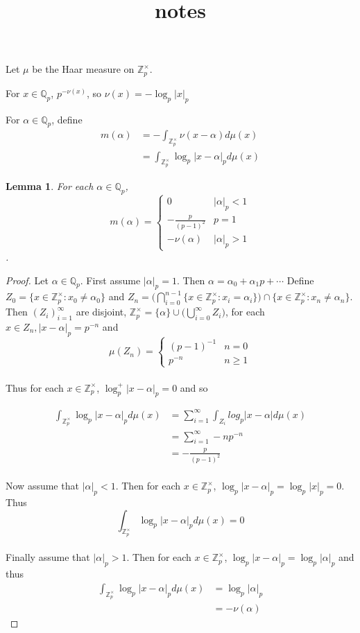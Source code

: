 \documentclass[12pt]{amsart}
\newtheorem{lem}[thm]{Lemma}
\newcommand{\al}{\alpha}
\newcommand{\Z}{\mathbb{Z}}
\newcommand{\Q}{\mathbb{Q}}
\begin{document}
\title{notes}
\maketitle

Let $\mu$ be the Haar measure on $\Z_p^{\times}$.

For $x \in \Q_p$, $p^{-\nu(x)}$, so $\nu(x) = -\log_p|x|_p$

For $\al \in \Q_p$, define 
\begin{align*}
m(\al)
& = -\int_{\Z_p^{\times}}\nu(x-\al)d\mu(x)\\
& = \int_{\Z_p^{\times}}\log_p|x-\al|_pd\mu(x)
\end{align*}

\begin{lem}
For each $\al \in \Q_p$, 
$$m(\al) = 
\begin{cases} 
      0 & |\al|_p <1 \\
      -\frac{p}{(p-1)^2} & p = 1\\
      -\nu(\al) & |\al|_p >1
   \end{cases}$$. 
\end{lem}

\begin{proof}
Let $\al \in \Q_p$. First assume $|\al|_p=1$. Then $\al = \al_0 + \al_1p + \cdots$ Define $Z_0 = \{x \in \Z_p^{\times} : x_0 \neq \al_0\}$ and $Z_n = \bigg(\bigcap_{i=0}^{n-1}\{x \in \Z_p^{\times}: x_i = \al_i\}\bigg) \cap \{x \in \Z_p^{\times}: x_n \neq \al_n\}$. \\Then $(Z_i)_{i=1}^{\infty}$ are disjoint, $\Z_p^{\times} = \{\al\} \cup \bigg(\bigcup_{i=0}^{\infty} Z_i\bigg)$, for each $x \in Z_n, |x-\al|_p = p^{-n}$ and $$ \mu(Z_n) =  \begin{cases} 
      (p-1)^{-1} & n=0 \\
      p^{-n} & n \geq 1
   \end{cases} $$ \\ Thus for each $x \in \Z_p^{\times}$, $\log^+_p|x-\al|_p = 0$ and so 

\begin{align*}
\int_{\Z_p^{\times} }\log_p|x-\al|_pd\mu(x)
&= \sum_{i=1}^{\infty} \int_{Z_i}log_p|x-\al|d\mu(x)\\
&= \sum_{i=1}^\infty -np^{-n}\\
&= -\frac{p}{(p-1)^2}
\end{align*} \\ Now assume that $|\al|_p <1$. Then for each $x \in \Z_p^{\times}$, $\log_p|x-\al|_p= \log_p|x|_p =0$. Thus $$\int_{\Z_p^{\times}}\log_p|x-\al|_pd\mu(x) =0$$ \\Finally assume that $|\al|_p >1$. Then for each $x \in \Z_p^{\times}$, $\log_p|x-\al|_p = \log_p|\al|_p$ and thus \begin{align*}
\int_{\Z_p^{\times}}\log_p|x-\al|_pd\mu(x) 
&= \log_p|\al|_p\\
&= -\nu(\al)
\end{align*}
\end{proof}
\end{document}
